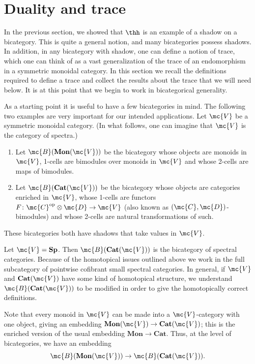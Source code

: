 \documentclass[11pt]{amsart}
\newcommand{\mbf}{\mathbf}
\begin{document}
\section{Duality and  trace}\label{sect:duality_and_trace}

In the previous section, we showed that $\thh$ is an example of a shadow on a bicategory. This is quite a general notion, and many bicategories possess shadows. In addition, in any bicategory with shadow, one can define a notion of trace, which one can think of as a vast generalization of the trace of an endomorphism in a symmetric monoidal category. In this section we recall the definitions required to define a trace and collect the results about the trace that we will need below. It is at this point that we begin to work in bicategorical generality. 

As a starting point it is useful to have a few bicategories in mind. 
The following two examples are very important for our intended applications.  Let $\mc{V}$ be a symmetric monoidal category. (In what follows, one can imagine that $\mc{V}$ is the category of spectra.) 
\begin{enumerate}
  \item   Let $\mc{B}(\mathbf{Mon}(\mc{V}))$ be the bicategory whose  objects are monoids in $\mc{V}$, 1-cells are bimodules over monoids in $\mc{V}$ and whose 2-cells are maps of bimodules.
  \item  Let $\mc{B}(\mathbf{Cat}(\mc{V}))$ be the bicategory whose objects are categories enriched in $\mc{V}$, whose 1-cells are functors $F \colon  \mc{C}^{\text{op}} \otimes \mc{D} \to \mc{V}$ (also known as $(\mc{C}, \mc{D})$-bimodules) and whose 2-cells are natural transformations of such. 
\end{enumerate}
These bicategories both have shadows that take values in $\mc{V}$.

\begin{example}\label{bcat_example}
Let $\mc{V} = \mbf{Sp}$. Then $\mc{B}(\mathbf{Cat}(\mc{V}))$ is the bicategory of spectral categories. Because of the homotopical issues outlined above we work in the full subcategory of pointwise cofibrant small spectral categories. In general, if $\mc{V}$ and $\mbf{Cat}(\mc{V})$ have some kind of homotopical structure, we understand $\mc{B}(\mbf{Cat}(\mc{V}))$ to be modified in order to give the homotopically correct definitions. 
\end{example}

\begin{rmk}
  Note that every monoid in $\mc{V}$ can be made into a $\mc{V}$-category with one object, giving an embedding $\mbf{Mon}(\mc{V}) \to \mbf{Cat}(\mc{V})$; this is the enriched version of the usual embedding $\mbf{Mon} \to \mbf{Cat}$. Thus, at the level of bicategories, we have an embedding
  \[
  \mc{B}(\mbf{Mon}(\mc{V})) \to \mc{B}(\mbf{Cat}(\mc{V})).  
  \]
\end{rmk} 
\end{document}

